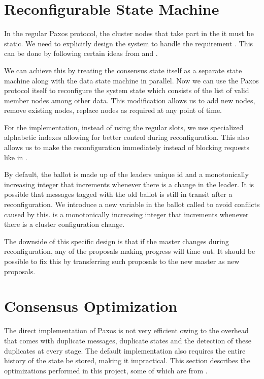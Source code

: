 \section{Reconfigurable State Machine}
\label{section:a.n.d.reconfig}

In the regular Paxos protocol, the cluster nodes that take part in the
it must be static. We need to explicitly design the system to handle
the requirement . This can be done by
following certain ideas from \citet{LamportSP08} and \citet{LamportMZ10}.

We can achieve this by treating the consensus state itself as a separate
state machine along with the data state machine in parallel. Now we can use
the Paxos protocol itself to reconfigure the system state which consists
of the list of valid member nodes among other data. This modification allows
us to add new nodes, remove existing nodes, replace nodes as required at any
point of time.

For the implementation, instead of using the regular slots, we use specialized
alphabetic indexes allowing for better control during reconfiguration. This also
allows us to make the reconfiguration immediately instead of blocking requests
like in \citet{LamportSP08}.

By default, the ballot is made up of the leaders unique id and a monotonically
increasing
integer that increments whenever there is a change in the leader. It is possible
that messages tagged with the old ballot is still in transit after a
reconfiguration. We introduce a new variable in the ballot called  to
avoid conflicts caused by this.  is a monotonically
increasing integer that increments whenever there is a cluster
configuration change.

The downside of this specific design is that if the master changes during
reconfiguration, any of the proposals making progress will time out. It
should be possible to fix this by transferring such proposals to the new master
as new proposals.

\section{Consensus Optimization}
\label{section:consensus.optimization}

The direct implementation of Paxos is not very efficient owing to the overhead
that comes with duplicate messages, duplicate states and the detection of these
duplicates at every stage. The default implementation also requires the
entire history of the
state be stored, making it impractical. This section describes the optimizations
performed in this project, some of which are from \citet{Robbert2011}.

